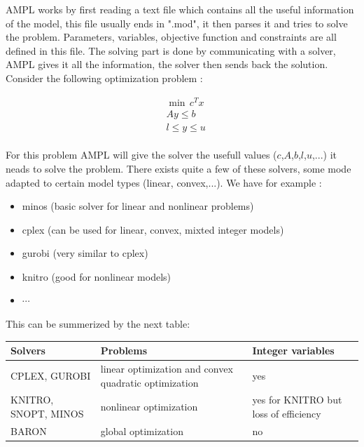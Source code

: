 AMPL works by first reading a text file which contains all the useful information of the model, this file usually ends in ".mod", it then parses it and tries to solve the problem. Parameters, variables, objective function and constraints are all defined in this file. The solving part is done by communicating with a solver, AMPL gives it all the information, the solver then sends back the solution. 
Consider the following optimization problem :

\begin{align*}
          &\min \, c^Tx  \\ 
       	 & Ay\le b\\
	 & l\le y\le u
\end{align*}
\\

For this problem AMPL will give the solver the usefull values ($c$,$A$,$b$,$l$,$u$,...) it neads to solve the problem. There exists quite a few of these solvers, some mode adapted to certain model types (linear, convex,...). 
We have for example :  \\

\begin{itemize}
  \item minos (basic solver for linear and nonlinear problems)
  \item cplex (can be used for linear, convex, mixted integer models)
  \item gurobi (very similar to cplex)
  \item knitro (good for nonlinear models)
  \item $\cdots$
\end{itemize} 

This can be summerized by the next table: 

\begin{tabular}{|C{0.2 \textwidth}|L{0.5 \textwidth}|C{0.2 \textwidth}|}
\hline
Solvers & Problems & Integer variables \\
\hline
\hline
CPLEX, GUROBI & linear optimization and convex quadratic optimization & yes \\
\hline
KNITRO, SNOPT, MINOS & nonlinear optimization & yes for KNITRO but loss of efficiency \\
\hline
BARON & global optimization & no \\
\hline
\end{tabular}

